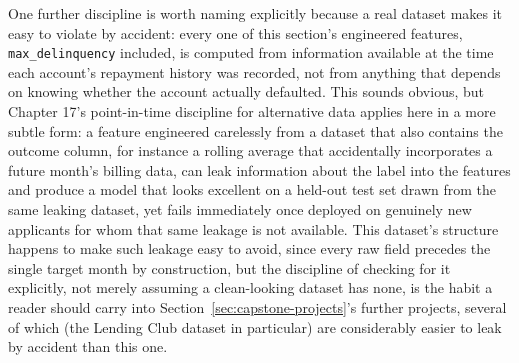 \documentclass[../ai_in_finance]{subfiles}
\begin{document}
One further discipline is worth naming explicitly because a real dataset makes it easy to violate by accident: every one of this section's engineered features, \texttt{max\_\allowbreak delinquency} included, is computed from information available at the time each account's repayment history was recorded, not from anything that depends on knowing whether the account actually defaulted. This sounds obvious, but Chapter 17's point-in-time discipline for alternative data applies here in a more subtle form: a feature engineered carelessly from a dataset that also contains the outcome column, for instance a rolling average that accidentally incorporates a future month's billing data, can leak information about the label into the features and produce a model that looks excellent on a held-out test set drawn from the same leaking dataset, yet fails immediately once deployed on genuinely new applicants for whom that same leakage is not available. This dataset's structure happens to make such leakage easy to avoid, since every raw field precedes the single target month by construction, but the discipline of checking for it explicitly, not merely assuming a clean-looking dataset has none, is the habit a reader should carry into Section~\ref{sec:capstone-projects}'s further projects, several of which (the Lending Club dataset in particular) are considerably easier to leak by accident than this one.
\end{document}
